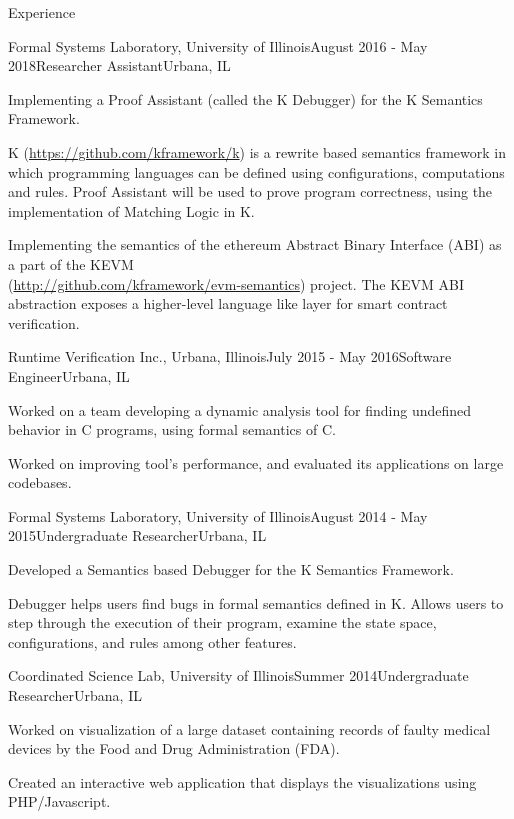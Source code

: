 \documentclass{resume} %
\begin{document}
\begin{rSection}{Experience}
\begin{rSubsection}{Formal Systems Laboratory, University of Illinois}{August 2016 - May 2018}{Researcher Assistant}{Urbana, IL}
\item Implementing a Proof Assistant (called the K Debugger) for the K Semantics Framework.
\item K (\url{https://github.com/kframework/k}) is a rewrite based semantics framework in which programming
languages can be defined using configurations, computations and rules. Proof Assistant will be used to prove program correctness, using the implementation of Matching Logic in K.
\item Implementing the semantics of the ethereum Abstract Binary Interface (ABI) as a part of the KEVM \\
  (\url{http://github.com/kframework/evm-semantics}) project. The KEVM ABI abstraction
  exposes a higher-level language like layer for smart contract verification.
\end{rSubsection}

\begin{rSubsection}{Runtime Verification Inc., Urbana, Illinois}{July 2015 - May 2016}{Software Engineer}{Urbana, IL}
\item Worked on a team developing a dynamic analysis tool for finding undefined behavior in C programs, using formal semantics of C.
\item Worked on improving tool's performance, and evaluated its applications on large codebases.
\end{rSubsection}

\begin{rSubsection}{Formal Systems Laboratory, University of Illinois}{August 2014 - May 2015}{Undergraduate Researcher}{Urbana, IL}
\item Developed a Semantics based Debugger for the K Semantics Framework.
\item Debugger helps users find bugs in formal semantics defined in K. Allows users to step
through the execution of their program, examine the state space, configurations, and rules
among other features.
\end{rSubsection}

\begin{rSubsection}{Coordinated Science Lab, University of Illinois}{Summer 2014}{Undergraduate Researcher}{Urbana, IL}
\item Worked on visualization of a large dataset containing records of faulty medical devices by the Food and Drug Administration (FDA).
\item Created an interactive web application that displays the visualizations using PHP/Javascript.
\end{rSubsection}

\end{rSection}
\end{document}

